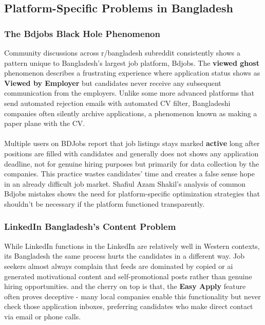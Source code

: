 \documentclass[a4paper, 14pt, openany]{extreport}
\begin{document}
	\subsection{Platform-Specific Problems in Bangladesh}
	
	\subsubsection{The Bdjobs \textbf{Black Hole} Phenomenon}
	
	Community discussions across r/bangladesh subreddit consistently shows a pattern unique to Bangladesh's largest job platform, Bdjobs. The \textbf{viewed ghost} phenomenon describes a frustrating experience where application status shows as \textbf{Viewed by Employer} but candidates never receive any subsequent communication\cite{reddit_job_mental_health} from the employers. Unlike some more advanced platforms that send automated rejection emails with automated CV filter, Bangladeshi companies often silently archive applications, a phenomenon known as making a paper plane with the CV.
	\\
	\\
	Multiple users on BDJobs\cite{bdjobs} report that job listings stays marked \textbf{active} long after positions are filled with candidates and generally does not shows any application deadline, not for genuine hiring purposes but primarily for data collection\cite{bdjobs_optimization_video} by the companies. This practice wastes candidates' time and creates a false sense hope in an already difficult job market. Shafiul Azam Shakil's analysis\cite{bdjobs_optimization_video} of common Bdjobs mistakes shows the need for platform-specific optimization strategies that shouldn't be necessary if the platform functioned transparently.
	
	\subsubsection{LinkedIn Bangladesh's Content Problem}
	
	While LinkedIn functions in the LinkedIn are relatively well in Western contexts, its Bangladesh the same process hurts the candidates in a different way. Job seekers almost always complain that feeds are dominated by copied or ai generated motivational content and self-promotional posts rather than genuine hiring opportunities\cite{linkedin}. and the cherry on top is that, the \textbf{Easy Apply} feature often proves deceptive - many local companies enable this functionality but never check those application inboxes, preferring candidates who make direct contact via email or phone calls.
	
\end{document}
